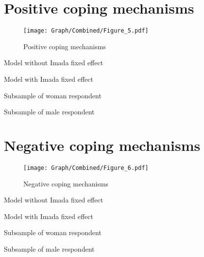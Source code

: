 \documentclass[10pt,a4paper]{article}
\begin{document}
\section{Positive coping mechanisms}
\begin{table}[H]\centering

\end{table}
\begin{figure}[H]\centering
\texttt{[image: Graph/Combined/Figure\_5.pdf]}
\caption{Positive coping mechanisms} \label{fig:Fig_5}
\end{figure}
\begin{table}[H]\centering\caption{Model without Imada fixed effect}

\end{table}
\begin{table}[H]\centering\caption{Model with Imada fixed effect}

\end{table}
\begin{table}[H]\centering\caption{Subsample of woman respondent}

\end{table}
\begin{table}[H]\centering\caption{Subsample of male respondent}

\end{table}
\pagebreak
\section{Negative coping mechanisms}
\begin{table}[H]\centering

\end{table}
\begin{figure}[H]\centering
\texttt{[image: Graph/Combined/Figure\_6.pdf]}
\caption{Negative coping mechanisms} \label{fig:Fig_6}
\end{figure}
\begin{table}[H]\centering\caption{Model without Imada fixed effect}

\end{table}
\begin{table}[H]\centering\caption{Model with Imada fixed effect}

\end{table}
\begin{table}[H]\centering\caption{Subsample of woman respondent}

\end{table}
\begin{table}[H]\centering\caption{Subsample of male respondent}

\end{table}
\pagebreak
\end{document}
